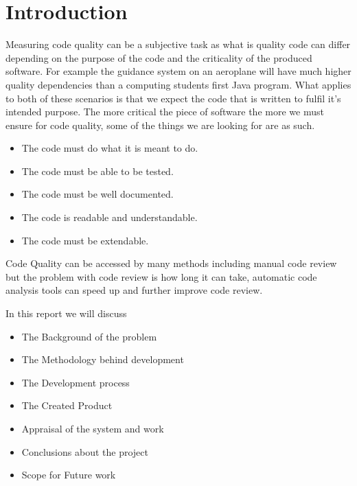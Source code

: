 \section{Introduction}
Measuring code quality can be a subjective task as what is quality code can differ depending on the purpose of the code and the criticality of the produced software.
For example the guidance system on an aeroplane will have much higher quality dependencies than a computing students first Java program.
What applies to both of these scenarios is that we expect the code that is written to fulfil it's intended purpose.
The more critical the piece of software the more we must ensure for code quality, some of the things we are looking for are as such.
\begin{itemize}
    \item The code must do what it is meant to do.
    \item The code must be able to be tested.
    \item The code must be well documented.
    \item The code is readable and understandable.
    \item The code must be extendable.
\end{itemize}
Code Quality can be accessed by many methods including manual code review but the problem with code review 
is how long it can take, automatic code analysis tools can speed up and further improve code review. 

In this report we will discuss
\begin{itemize}
    \item The Background of the problem 
    \item The Methodology behind development 
    \item The Development process 
    \item The Created Product
    \item Appraisal of the system and work
    \item Conclusions about the project
    \item Scope for Future work 
\end{itemize}
